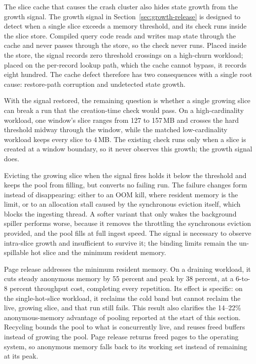 The slice cache that causes the crash cluster also hides state growth from the growth signal.
The growth signal in Section~\ref{sec:growth-release} is designed to detect when a single slice exceeds a memory threshold, and its check runs inside the slice store.
Compiled query code reads and writes map state through the cache and never passes through the store, so the check never runs.
Placed inside the store, the signal records zero threshold crossings on a high-churn workload; placed on the per-record lookup path, which the cache cannot bypass, it records eight hundred.
The cache defect therefore has two consequences with a single root cause: restore-path corruption and undetected state growth.

With the signal restored, the remaining question is whether a single growing slice can break a run that the creation-time check would pass.
On a high-cardinality workload, one window's slice ranges from 127 to 157\,MB and crosses the hard threshold midway through the window, while the matched low-cardinality workload keeps every slice to 4\,MB.
The existing check runs only when a slice is created at a window boundary, so it never observes this growth; the growth signal does.

Evicting the growing slice when the signal fires holds it below the threshold and keeps the pool from filling, but converts no failing run.
The failure changes form instead of disappearing: either to an OOM kill, where resident memory is the limit, or to an allocation stall caused by the synchronous eviction itself, which blocks the ingesting thread.
A softer variant that only wakes the background spiller performs worse, because it removes the throttling the synchronous eviction provided, and the pool fills at full ingest speed.
The signal is necessary to observe intra-slice growth and insufficient to survive it; the binding limits remain the un-spillable hot slice and the minimum resident memory.

Page release addresses the minimum resident memory.
On a draining workload, it cuts steady anonymous memory by 55 percent and peak by 38 percent, at a 6-to-8 percent throughput cost, completing every repetition.
Its effect is specific: on the single-hot-slice workload, it reclaims the cold band but cannot reclaim the live, growing slice, and that run still fails.
This result also clarifies the 14--22\% anonymous-memory advantage of pooling reported at the start of this section.
Recycling bounds the pool to what is concurrently live, and reuses freed buffers instead of growing the pool.
Page release returns freed pages to the operating system, so anonymous memory falls back to its working set instead of remaining at its peak.

